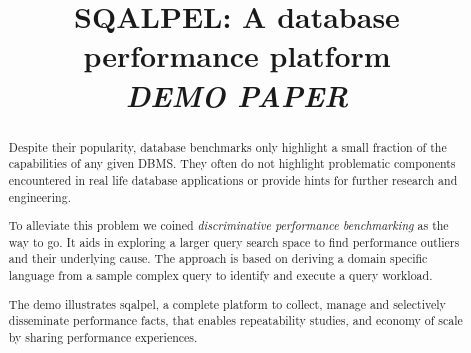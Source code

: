\documentclass{cidr-2019}
\begin{document}
\title{SQALPEL: A database performance platform\\\emph{DEMO PAPER}}
\author{
}

\maketitle
\date{}

\begin{abstract}
Despite their popularity, database benchmarks only highlight a small
fraction of the capabilities of any given DBMS. They often do not
highlight problematic components encountered in real life database
applications or provide hints for further research and engineering.



To alleviate this problem we coined \textit{discriminative performance
  benchmarking} as the way to go. It aids in exploring a larger query search
space to find performance outliers and their underlying cause. The
approach is based on deriving a domain specific language from a sample
complex query to identify and execute a query workload.

The demo illustrates {\sc sqalpel}, a complete platform to collect,
manage and selectively disseminate performance facts, that enables
repeatability studies, and economy of scale by sharing performance
experiences.

\end{abstract}
\end{document}
